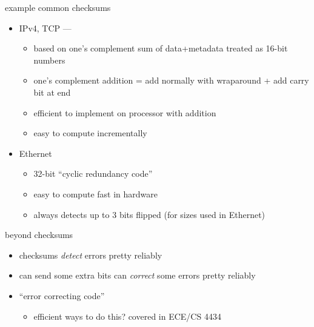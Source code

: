 \begin{frame}[fragile]{example common checksums}
    \begin{itemize}
    \item IPv4, TCP ---
        \begin{itemize}
        \item based on one's complement sum of data+metadata treated as 16-bit numbers
        \item one's complement addition = add normally with wraparound + add carry bit at end
        \item efficient to implement on processor with addition
        \item easy to compute incrementally
        \end{itemize}
    \item Ethernet
        \begin{itemize}
        \item 32-bit ``cyclic redundancy code''
        \item easy to compute fast in hardware
        \item always detects up to 3 bits flipped (for sizes used in Ethernet)
        \end{itemize}
    \end{itemize}
\end{frame}

\begin{frame}{beyond checksums}
    \begin{itemize}
    \item checksums \textit{detect} errors pretty reliably
    \vspace{.5cm}
    \item can send some extra bits can \textit{correct} some errors pretty reliably
    \item ``error correcting code''
        \begin{itemize}
        \item efficient ways to do this? covered in ECE/CS 4434
        \end{itemize}
    \end{itemize}
\end{frame}
